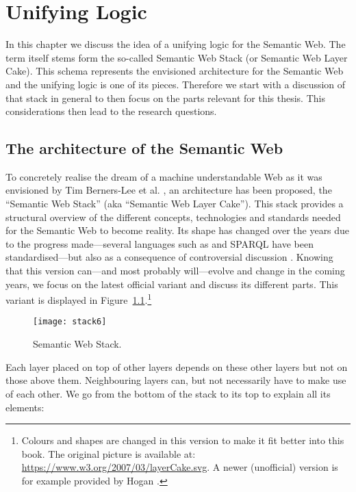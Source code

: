\chapter{Unifying Logic} \label{uni}
In this chapter we discuss the idea of a unifying logic for the Semantic Web. The term itself stems form the so-called Semantic Web Stack (or Semantic Web Layer Cake).
This schema represents the envisioned architecture for the Semantic Web and the unifying logic is one of its pieces.
Therefore we start with a discussion of that stack in general to then focus on the parts relevant for this thesis. This considerations then lead to the research questions.


\section{The architecture of the Semantic Web}
 To concretely realise the dream of a machine understandable Web as it was envisioned by Tim Berners-Lee et al. \cite{SemanticWeb}, 
an architecture has been proposed, the  
 ``Semantic Web Stack'' (aka ``Semantic Web Layer Cake'').
This stack provides a structural overview of the different concepts, technologies and standards needed for the Semantic Web to become reality. 
Its shape has changed over the years \cite{Gerber2} due to the progress made---several languages such as \rdf \cite{rdf} and SPARQL \cite{sparql} have been standardised---but also 
as a consequence of controversial discussion \cite{twotowers,rearch}. 
Knowing that this version can---and most probably will---evolve and change in the coming years, 
we focus %
on the latest official 
variant %
 and discuss its different parts. This variant is displayed in Figure~\ref{fig:stack}.\footnote{Colours and shapes are changed in this version to make it fit better into this book. 
The original picture is available at: 
\url{https://www.w3.org/2007/03/layerCake.svg}.
A newer (unofficial) version is for example provided by Hogan \cite{hogan}.} 
\begin{figure}[h!]
	\centering
	\texttt{[image: stack6]}
	\caption[Semantic Web Stack]{Semantic Web Stack.}
	\label{fig:stack}
\end{figure}
Each layer placed on top of other layers  depends on  these other layers but not on those above them. Neighbouring layers can, but not necessarily have to make use of each other. 
We go from the bottom of the stack to its top to explain all its elements:

